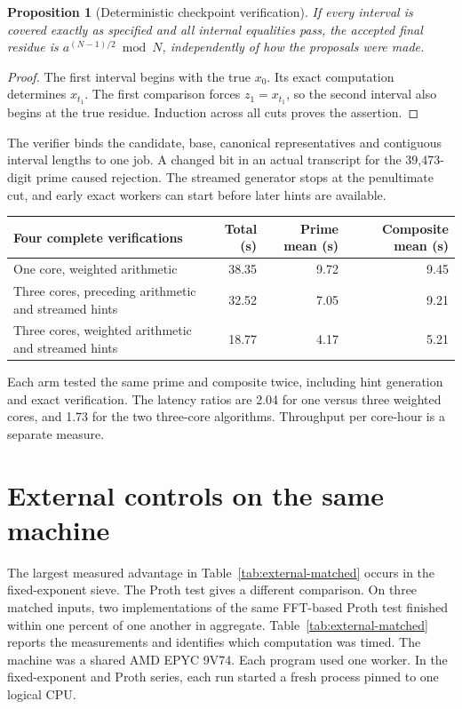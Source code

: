 \documentclass[11pt,a4paper,oneside,openany]{report}
\newtheorem{proposition}[theorem]{Proposition}
\begin{document}
\begin{proposition}[Deterministic checkpoint verification]
If every interval is covered exactly as specified and all internal equalities pass, the accepted final residue is $a^{(N-1)/2}\bmod N$, independently of how the proposals were made.
\end{proposition}
\begin{proof}
The first interval begins with the true $x_0$. Its exact computation determines $x_{t_1}$. The first comparison forces $z_1=x_{t_1}$, so the second interval also begins at the true residue. Induction across all cuts proves the assertion.
\end{proof}
The verifier binds the candidate, base, canonical representatives and contiguous interval lengths to one job. A changed bit in an actual transcript for the 39,473-digit prime caused rejection. The streamed generator stops at the penultimate cut, and early exact workers can start before later hints are available.
\begin{center}\small
\begin{tabular}{@{}lrrr@{}}\toprule
Four complete verifications & Total (s) & Prime mean (s) & Composite mean (s)\\\midrule
One core, weighted arithmetic &38.35 &9.72&9.45\\
Three cores, preceding arithmetic and streamed hints &32.52&7.05&9.21\\
Three cores, weighted arithmetic and streamed hints &18.77&4.17&5.21\\\bottomrule
\end{tabular}
\end{center}
Each arm tested the same prime and composite twice, including hint generation and exact verification. The latency ratios are 2.04 for one versus three weighted cores, and 1.73 for the two three-core algorithms. Throughput per core-hour is a separate measure.

\endgroup

\chapter{External controls on the same machine}
\label{ch:externalcontrols}

The largest measured advantage in Table~\ref{tab:external-matched} occurs in the fixed-exponent sieve. The Proth test gives a different comparison. On three matched inputs, two implementations of the same FFT-based Proth test finished within one percent of one another in aggregate. Table~\ref{tab:external-matched} reports the measurements and identifies which computation was timed. The machine was a shared AMD EPYC 9V74. Each program used one worker. In the fixed-exponent and Proth series, each run started a fresh process pinned to one logical CPU.
\end{document}
